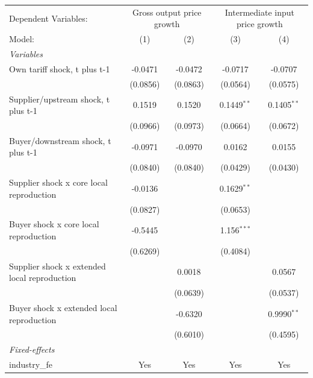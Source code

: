 \begingroup
\centering
\begin{tabular}{lcccc}
   \tabularnewline \midrule \midrule
   Dependent Variables: & \multicolumn{2}{c}{Gross output price growth} & \multicolumn{2}{c}{Intermediate input price growth}\\
   Model:                                       & (1)      & (2)      & (3)           & (4)\\  
   \midrule
   \emph{Variables}\\
   Own tariff shock, t plus t-1                 & -0.0471  & -0.0472  & -0.0717       & -0.0707\\   
                                                & (0.0856) & (0.0863) & (0.0564)      & (0.0575)\\   
   Supplier/upstream shock, t plus t-1          & 0.1519   & 0.1520   & 0.1449$^{**}$ & 0.1405$^{**}$\\   
                                                & (0.0966) & (0.0973) & (0.0664)      & (0.0672)\\   
   Buyer/downstream shock, t plus t-1           & -0.0971  & -0.0970  & 0.0162        & 0.0155\\   
                                                & (0.0840) & (0.0840) & (0.0429)      & (0.0430)\\   
   Supplier shock x core local reproduction     & -0.0136  &          & 0.1629$^{**}$ &   \\   
                                                & (0.0827) &          & (0.0653)      &   \\   
   Buyer shock x core local reproduction        & -0.5445  &          & 1.156$^{***}$ &   \\   
                                                & (0.6269) &          & (0.4084)      &   \\   
   Supplier shock x extended local reproduction &          & 0.0018   &               & 0.0567\\   
                                                &          & (0.0639) &               & (0.0537)\\   
   Buyer shock x extended local reproduction    &          & -0.6320  &               & 0.9990$^{**}$\\   
                                                &          & (0.6010) &               & (0.4595)\\   
   \midrule
   \emph{Fixed-effects}\\
   industry\_fe                                 & Yes      & Yes      & Yes           & Yes\\  

\end{tabular}
